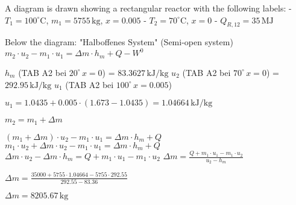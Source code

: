 A diagram is drawn showing a rectangular reactor with the following labels:  
- \( T_1 = 100^\circ \text{C} \), \( m_1 = 5755 \, \text{kg} \), \( x = 0.005 \)  
- \( T_2 = 70^\circ \text{C} \), \( x = 0 \)  
- \( Q_{R,12} = 35 \, \text{MJ} \)  

Below the diagram:  
"Halboffenes System" (Semi-open system)  
\( m_2 \cdot u_2 - m_1 \cdot u_1 = \Delta m \cdot h_m + Q - W^0 \)  

\( h_m \) (TAB A2 bei \( 20^\circ \, x = 0 \)) = \( 83.3627 \, \text{kJ/kg} \)  
\( u_2 \) (TAB A2 bei \( 70^\circ \, x = 0 \)) = \( 292.95 \, \text{kJ/kg} \)  
\( u_1 \) (TAB A2 bei \( 100^\circ \, x = 0.005 \))  

\( u_1 = 1.0435 + 0.005 \cdot (1.673 - 1.0435) = 1.04664 \, \text{kJ/kg} \)  

\( m_2 = m_1 + \Delta m \)  

\( (m_1 + \Delta m) \cdot u_2 - m_1 \cdot u_1 = \Delta m \cdot h_m + Q \)  
\( m_1 \cdot u_2 + \Delta m \cdot u_2 - m_1 \cdot u_1 = \Delta m \cdot h_m + Q \)  
\( \Delta m \cdot u_2 - \Delta m \cdot h_m = Q + m_1 \cdot u_1 - m_1 \cdot u_2 \)  
\( \Delta m = \frac{Q + m_1 \cdot u_1 - m_1 \cdot u_2}{u_2 - h_m} \)  

\( \Delta m = \frac{35000 + 5755 \cdot 1.04664 - 5755 \cdot 292.55}{292.55 - 83.36} \)  

\( \Delta m = 8205.67 \, \text{kg} \)